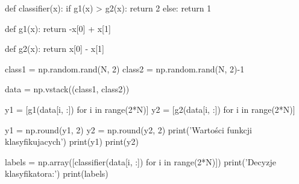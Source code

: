 def classifier(x):
    if g1(x) > g2(x):
        return 2
    else:
        return 1

def g1(x):
    return -x[0] + x[1]


def g2(x):
    return x[0] - x[1]


class1 = np.random.rand(N, 2)
class2 = np.random.rand(N, 2)-1

data = np.vstack((class1, class2))

y1 = [g1(data[i, :]) for i in range(2*N)]
y2 = [g2(data[i, :]) for i in range(2*N)]

y1 = np.round(y1, 2)
y2 = np.round(y2, 2)
print('Wartości funkcji klasyfikujacych')
print(y1)
print(y2)

labels = np.array([classifier(data[i, :]) for i in range(2*N)])
print('Decyzje klasyfikatora:')
print(labels)